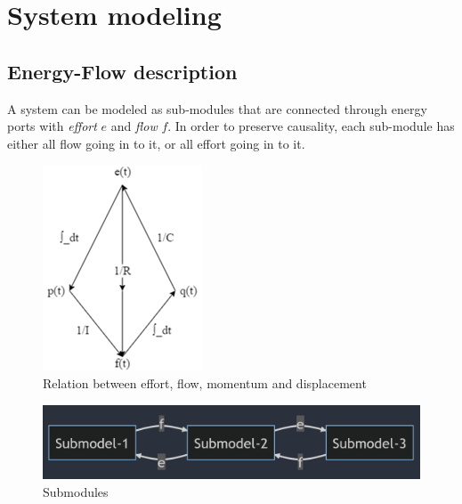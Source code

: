 \section{System modeling}

\subsection{Energy-Flow description}

A system can be modeled as sub-modules that are connected through energy ports with \textit{effort} $e$ and \textit{flow} $f$. In order to preserve causality, each sub-module has either all flow going in to it, or all effort going in to it. 

\begin{figure}[H]
    \centering
    \includegraphics{figures/effort-flow.png}
    \caption{Relation between effort, flow, momentum and displacement}
    \label{fig:relation_effort_flow}
\end{figure}
\begin{figure}[H]
    \centering
    \includegraphics[scale=0.5]{figures/effort-flow-submodules.png}
    \caption{Submodules}
    \label{fig:effort-flow-submodules}
\end{figure}

